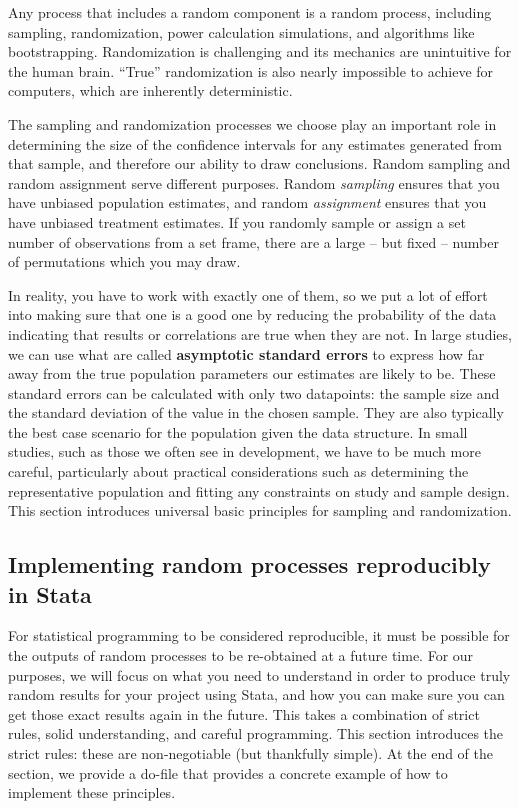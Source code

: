 Any process that includes a random component is a random process,
including sampling, randomization, power calculation simulations, and algorithms like bootstrapping.
Randomization is challenging and its mechanics are unintuitive for the human brain.
``True'' randomization is also nearly impossible to achieve for computers,
which are inherently deterministic.

The sampling and randomization processes we choose
play an important role in determining the size of the confidence intervals
for any estimates generated from that sample,
and therefore our ability to draw conclusions.
Random sampling and random assignment serve different purposes.
Random \textit{sampling} ensures that you have unbiased population estimates,
and random \textit{assignment} ensures that you have unbiased treatment estimates.
If you randomly sample or assign a set number of observations from a set frame,
there are a large -- but fixed -- number of permutations which you may draw.

In reality, you have to work with exactly one of them,
so we put a lot of effort into making sure that one is a good one
by reducing the probability of the data indicating that results or correlations are true when they are not.
In large studies, we can use what are called \textbf{asymptotic standard errors}
to express how far away from the true population parameters our estimates are likely to be.
These standard errors can be calculated with only two datapoints:
the sample size and the standard deviation of the value in the chosen sample.
They are also typically the best case scenario for the population given the data structure.
In small studies, such as those we often see in development,
we have to be much more careful, particularly about practical considerations
such as determining the representative population
and fitting any constraints on study and sample design.
This section introduces universal basic principles for sampling and randomization.


\subsection{Implementing random processes reproducibly in Stata}

For statistical programming to be considered reproducible, it must be possible for the outputs of random processes
to be re-obtained at a future time.\cite{orozco2018make}
For our purposes, we will focus on what you need to understand
in order to produce truly random results for your project using Stata,
and how you can make sure you can get those exact results again in the future.
This takes a combination of strict rules, solid understanding, and careful programming.
This section introduces the strict rules: these are non-negotiable (but thankfully simple). 
At the end of the section, 
we provide a do-file that provides a concrete example of how to implement these principles. 

